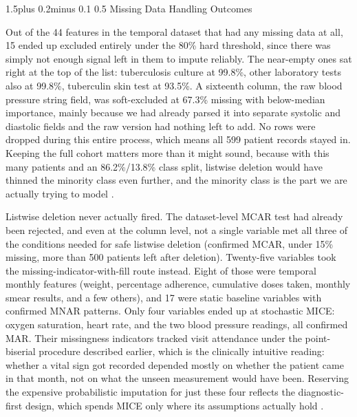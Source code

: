 \documentclass[12pt]{article}
\makeatletter
\renewcommand{\_}{\textunderscore\allowbreak}
\renewcommand{\subsection}{\@startsection{subsection}{2}{0pt}%
  {1.5\baselineskip plus 0.2\baselineskip minus 0.1\baselineskip}%
  {0.5\baselineskip}%
  {\bfseries\normalsize}}
\makeatother
\begin{document}
\FloatBarrier
\subsection{Missing Data Handling Outcomes}

Out of the 44 features in the temporal dataset that had any missing data at all, 15 ended up excluded entirely under the 80\% hard threshold, since there was simply not enough signal left in them to impute reliably. The near-empty ones sat right at the top of the list: tuberculosis culture at 99.8\%, other laboratory tests also at 99.8\%, tuberculin skin test at 93.5\%. A sixteenth column, the raw blood pressure string field, was soft-excluded at 67.3\% missing with below-median importance, mainly because we had already parsed it into separate systolic and diastolic fields and the raw version had nothing left to add. No rows were dropped during this entire process, which means all 599 patient records stayed in. Keeping the full cohort matters more than it might sound, because with this many patients and an 86.2\%/13.8\% class split, listwise deletion would have thinned the minority class even further, and the minority class is the part we are actually trying to model \citep{ref32}.

Listwise deletion never actually fired. The dataset-level MCAR test had already been rejected, and even at the column level, not a single variable met all three of the conditions needed for safe listwise deletion (confirmed MCAR, under 15\% missing, more than 500 patients left after deletion). Twenty-five variables took the missing-indicator-with-fill route instead. Eight of those were temporal monthly features (weight, percentage adherence, cumulative doses taken, monthly smear results, and a few others), and 17 were static baseline variables with confirmed MNAR patterns. Only four variables ended up at stochastic MICE: oxygen saturation, heart rate, and the two blood pressure readings, all confirmed MAR. Their missingness indicators tracked visit attendance under the point-biserial procedure described earlier, which is the clinically intuitive reading: whether a vital sign got recorded depended mostly on whether the patient came in that month, not on what the unseen measurement would have been. Reserving the expensive probabilistic imputation for just these four reflects the diagnostic-first design, which spends MICE only where its assumptions actually hold \citep{ref31, ref33}.


\FloatBarrier
\end{document}
